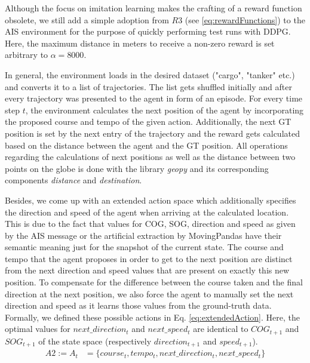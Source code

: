 Although the focus on imitation learning makes the crafting of a reward function obsolete, we still add a simple adoption from $R3$ (see \ref{eq:rewardFunctions}) to the AIS environment for the purpose of quickly performing test runs with DDPG. Here, the maximum distance in meters to receive a non-zero reward is set arbitrary to $\alpha=8000$.
\par
In general, the environment loads in the desired dataset ("cargo", "tanker" etc.) and converts it to a list of trajectories. The list gets shuffled initially and after every trajectory was presented to the agent in form of an episode. For every time step $t$, the environment calculates the next position of the agent by incorporating the proposed course and tempo of the given action. Additionally, the next GT position is set by the next entry of the trajectory and the reward gets calculated based on the distance between the agent and the GT position. All operations regarding the calculations of next positions as well as the distance between two points on the globe is done with the library \textit{geopy} and its corresponding components \textit{distance} and \textit{destination}.
\par
Besides, we come up with an extended action space which additionally specifies the direction and speed of the agent when arriving at the calculated location. This is due to the fact that values for COG, SOG, direction and speed as given by the AIS message or the artificial extraction by MovingPandas have their semantic meaning just for the snapshot of the current state. The course and tempo that the agent proposes in order to get to the next position are distinct from the next direction and speed values that are present on exactly this new position. To compensate for the difference between the course taken and the final direction at the next position, we also force the agent to manually set the next direction and speed as it learns those values from the ground-truth data. Formally, we defined these possible actions in Eq.  \ref{eq:extendedAction}. Here, the optimal values for $next\_direction_t$ and $next\_speed_t$ are identical to $COG_{t+1}$ and $SOG_{t+1}$ of the state space (respectively $direction_{t+1}$ and $speed_{t+1}$).
\begin{equation}
\begin{aligned}
    A2 := A_t &= \{course_t, tempo_t, next\_direction_t, next\_speed_t\}
    \end{aligned}
\end{equation} \label{eq:extendedAction}

